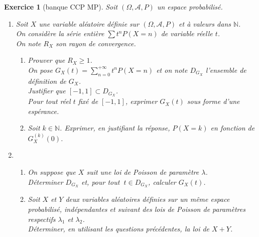 \documentclass[12pt,a4paper,landscape]{article}
\newtheorem{Exo}{Exercice}
\begin{document}
\begin{Exo}[banque CCP MP]
	Soit $(\Omega,\mathcal{A},P)$ un espace probabilisé.\\
	
	\begin{enumerate}
		\item 
		Soit $X$ une variable aléatoire définie sur  $(\Omega,\mathcal{A},P)$ et à valeurs dans $\mathbb{N}$.\\
		On considère la série entière  $\displaystyle\sum t^nP(X=n)$ de variable réelle $t$.\\
		On note $R_X$ son rayon de convergence.\\
		\begin{enumerate}
			\item 
			Prouver que $R_X\geqslant 1$.\:\:\:\:\\
			On pose  $G_X(t)=\displaystyle\sum\limits_ {n=0}^{+\infty}t^nP(X=n)$ et on  note $D_{G_X}$ l'ensemble de définition de $G_X$.\\
			Justifier que   $\left[-1,1 \right] \subset D_{G_X}$.\:\:\:\:\\
			
			Pour tout réel $t$ fixé de $\left[-1,1 \right]$, exprimer $G_X(t)$ sous forme d'une espérance.\:\:\:\:
			\item
			Soit $k\in\mathbb{N}$.
			Exprimer, en justifiant la réponse, $P(X=k)$ en fonction de  $G_X^{(k)}(0)$.\:\:\:\:
			
		\end{enumerate}
		\item 
		\begin{enumerate}
			\item
			On suppose que $X$ suit une loi de Poisson de paramètre $\lambda$.\\
			Déterminer $D_{G_X}$ et, pour tout $\:t\in D_{G_X}$, calculer $G_X(t)$.\:\:\:\:
			
			
			\item
			Soit $X$ et $Y$ deux variables aléatoires définies sur un même espace probabilisé, indépendantes  et suivant des lois de Poisson de paramètres respectifs $\lambda_1$ et $\lambda_2$.\\
			Déterminer, en utilisant les questions précédentes, la loi de $X+Y$.
		\end{enumerate}
	\end{enumerate}
\end{Exo}
\end{document}
